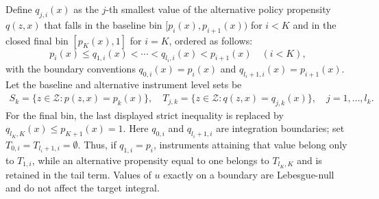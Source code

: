 Define $q_{j,i}(x)$ as the $j$-th smallest value of the alternative policy propensity $q(z,x)$ that falls in the baseline bin $[p_i(x), p_{i+1}(x))$ for $i<K$ and in the closed final bin $[p_K(x),1]$ for $i=K$, ordered as follows:
\begin{equation*}
    p_i(x) \leqslant q_{1,i}(x) < \cdots < q_{l_i, i}(x) <  p_{i+1}(x)\quad(i<K),
\end{equation*}
with the boundary conventions $q_{0,i}(x) = p_i(x)$ and $q_{l_i+1,i}(x) = p_{i+1}(x)$. Let the baseline and alternative instrument level sets be
\begin{align*}
    S_k = \{z \in \mathcal{Z} : p(z,x) = p_k(x)\}, \quad T_{j,k} = \{z \in \mathcal{Z} : q(z,x) = q_{j,k}(x)\}, \quad j=1,\ldots,l_k.
\end{align*}
For the final bin, the last displayed strict inequality is replaced by $q_{l_K,K}(x)\leqslant p_{K+1}(x)=1$. Here $q_{0,i}$ and $q_{l_i+1,i}$ are integration boundaries; set $T_{0,i}=T_{l_i+1,i}=\emptyset$. Thus, if $q_{1,i}=p_i$, instruments attaining that value belong only to $T_{1,i}$, while an alternative propensity equal to one belongs to $T_{l_K,K}$ and is retained in the tail term. Values of $u$ exactly on a boundary are Lebesgue-null and do not affect the target integral.

